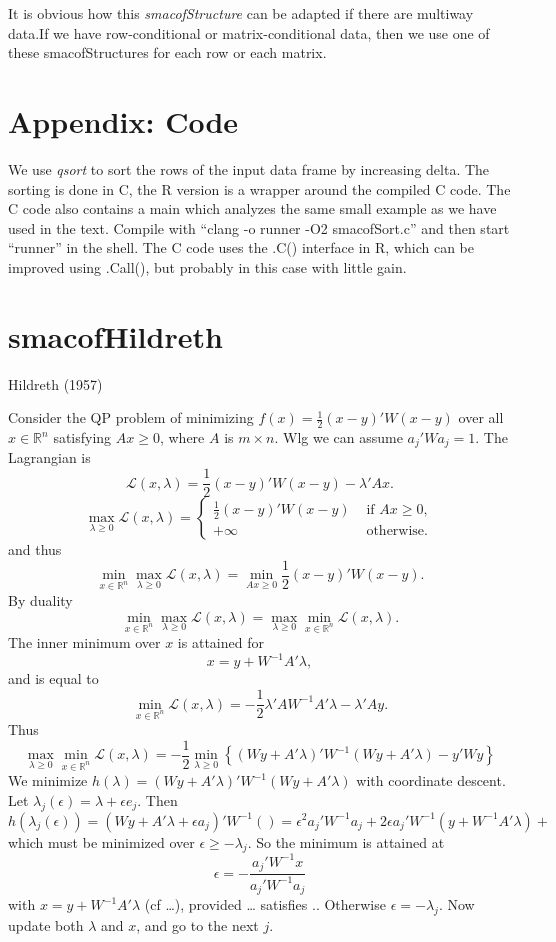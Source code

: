 \documentclass[
  12pt,
]{article}
\newcommand{\eps}{\epsilon}
\begin{document}
It is obvious how this \emph{smacofStructure} can be adapted if there are multiway data.If we have row-conditional or matrix-conditional data, then we use one of these smacofStructures for each
row or each matrix.

\section{Appendix: Code}\label{appendix-code}

We use \emph{qsort} to sort the rows of the input data frame by increasing delta. The sorting
is done in C, the R version is a wrapper around the compiled C code. The C code also
contains a main which analyzes the same small example as we have used in the text.
Compile with ``clang -o runner -O2 smacofSort.c'' and then start ``runner'' in the shell.
The C code uses the .C() interface in R, which can be improved using .Call(),
but probably in this case with little gain.

\section{smacofHildreth}\label{smacofhildreth}

Hildreth (1957)

Consider the QP problem of minimizing \(f(x)=\frac12(x-y)'W(x-y)\)
over all \(x\in\mathbb{R}^n\) satisfying \(Ax\geq 0\), where \(A\) is \(m\times n\). Wlg we can assume \(a_j'Wa_j=1\). The Lagrangian is
\[
\mathcal{L}(x,\lambda)=\frac12(x-y)'W(x-y)-\lambda'Ax.
\]
\[
\max_{\lambda\geq 0}\mathcal{L}(x,\lambda)=\begin{cases}\frac12(x-y)'W(x-y)&\text{ if }Ax\geq 0,\\
+\infty&\text{ otherwise}.\end{cases}
\]
and thus
\[
\min_{x\in\mathbb{R}^n}\max_{\lambda\geq 0}\mathcal{L}(x,\lambda)=\min_{Ax\geq 0}\frac12(x-y)'W(x-y).
\]
By duality
\[
\min_{x\in\mathbb{R}^n}\max_{\lambda\geq 0}\mathcal{L}(x,\lambda)=\max_{\lambda\geq 0}\min_{x\in\mathbb{R}^n}\mathcal{L}(x,\lambda).
\]
The inner minimum over \(x\) is attained for
\[
x=y+W^{-1}A'\lambda,
\]
and is equal to
\[
\min_{x\in\mathbb{R}^n}\mathcal{L}(x,\lambda)=-\frac12\lambda'AW^{-1}A'\lambda-\lambda'Ay.
\]
Thus
\[
\max_{\lambda\geq 0}\min_{x\in\mathbb{R}^n}\mathcal{L}(x,\lambda)=
-\frac12\min_{\lambda\geq 0}\left\{(Wy+A'\lambda)'W^{-1}(Wy+A'\lambda)-y'Wy\right\}
\]
We minimize \(h(\lambda)=(Wy+A'\lambda)'W^{-1}(Wy+A'\lambda)\) with coordinate descent. Let \(\lambda_j(\eps)=\lambda+\eps e_j\). Then
\[
h(\lambda_j(\eps))=(Wy+A'\lambda+\eps a_j)'W^{-1}()=\eps^2a_j'W^{-1}a_j+2\eps a_j'W^{-1}(y+W^{-1}A'\lambda)+
\]
which must be minimized over \(\eps\geq-\lambda_j\). So the minimum is attained at
\[
\eps=-\frac{a_j'W^{-1}x}{a_j'W^{-1}a_j}
\]
with \(x=y+W^{-1}A'\lambda\) (cf \ldots), provided \ldots{} satisfies .. Otherwise \(\eps=-\lambda_j\). Now update both \(\lambda\) and \(x\),
and go to the next \(j\).
\end{document}
